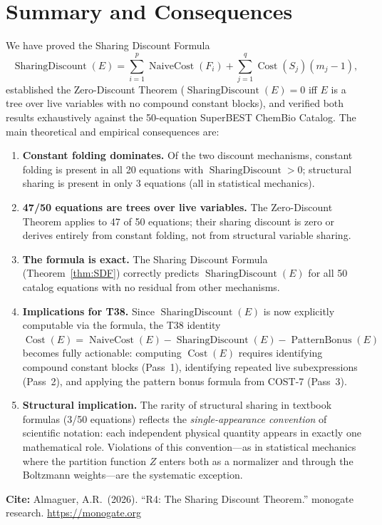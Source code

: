 \documentclass[12pt,a4paper]{article}
\theoremstyle{definition}
\newcommand{\Cost}{\operatorname{Cost}}
\newcommand{\NC}{\operatorname{NaiveCost}}
\newcommand{\SD}{\operatorname{SharingDiscount}}
\newcommand{\PB}{\operatorname{PatternBonus}}
\begin{document}
\section*{Summary and Consequences}
\label{sec:summary}

We have proved the Sharing Discount Formula
\[
  \SD(E) = \sum_{i=1}^{p} \NC(F_i) + \sum_{j=1}^{q} \Cost(S_j)(m_j - 1),
\]
established the Zero-Discount Theorem ($\SD(E) = 0$ iff $E$ is a tree over
live variables with no compound constant blocks), and verified both results
exhaustively against the 50-equation SuperBEST ChemBio Catalog.  The main
theoretical and empirical consequences are:

\begin{enumerate}
  \item \textbf{Constant folding dominates.}
        Of the two discount mechanisms, constant folding is present in all
        20 equations with $\SD > 0$; structural sharing is present in only
        3 equations (all in statistical mechanics).

  \item \textbf{47/50 equations are trees over live variables.}
        The Zero-Discount Theorem applies to 47 of 50 equations; their
        sharing discount is zero or derives entirely from constant folding,
        not from structural variable sharing.

  \item \textbf{The formula is exact.}
        The Sharing Discount Formula (Theorem~\ref{thm:SDF}) correctly
        predicts $\SD(E)$ for all 50 catalog equations with no residual
        from other mechanisms.

  \item \textbf{Implications for T38.}
        Since $\SD(E)$ is now explicitly computable via the formula, the
        T38 identity $\Cost(E) = \NC(E) - \SD(E) - \PB(E)$ becomes fully
        actionable: computing $\Cost(E)$ requires identifying compound
        constant blocks (Pass~1), identifying repeated live subexpressions
        (Pass~2), and applying the pattern bonus formula from COST-7 (Pass~3).

  \item \textbf{Structural implication.}
        The rarity of structural sharing in textbook formulas (3/50 equations)
        reflects the \emph{single-appearance convention} of scientific notation:
        each independent physical quantity appears in exactly one mathematical
        role.  Violations of this convention---as in statistical mechanics
        where the partition function $Z$ enters both as a normalizer and
        through the Boltzmann weights---are the systematic exception.
\end{enumerate}

\bigskip
\noindent\textbf{Cite:}
Almaguer, A.R.\ (2026).
``R4: The Sharing Discount Theorem.''
monogate research.
\url{https://monogate.org}
\end{document}
